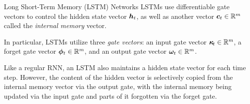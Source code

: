 %
%
%
\begin{frame}{Long Short-Term Memory (LSTM) Networks}
LSTMs %
use differentiable gate vectors to control the hidden
state vector ${\boldsymbol h}_t$, as well as another
vector ${\boldsymbol c}_t \in {\mathord{\mathbb R}}^m$ called the
{\em internal memory} vector. 
 
\medskip

In particular, LSTMs utilize three {\em gate vectors}:
an input gate vector ${\bm \kappa}_{\!t} \in {\mathord{\mathbb R}}^m$, 
a forget gate vector ${\bm \phi}_t \in {\mathord{\mathbb R}}^m$, 
and an output gate vector ${\bm \omega}_t \in {\mathord{\mathbb R}}^m$.
 
\medskip

Like a regular RNN, an LSTM also maintains a hidden state vector for each
time step. However, the content of the hidden vector is selectively
copied from the internal memory vector via the output gate, with the
internal memory being updated via the input gate and parts of
it forgotten via the forget gate.
\end{frame}
%
